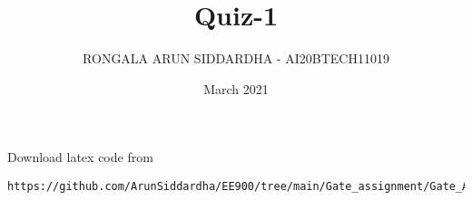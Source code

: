 \documentclass[journal,12pt,twocolumn]{IEEEtran}
\date{March 2021}
\DeclareMathOperator*{\Res}{Res}
\begin{document}
\newcommand{\multlinecomment}[1]{\directlua{-- #1}}
\newcommand{\BEQA}{\begin{eqnarray}}
\newcommand{\EEQA}{\end{eqnarray}}
\newcommand{\define}{\stackrel{\triangle}{=}}

\raggedbottom
\setlength{\parindent}{0pt}
\providecommand{\mbf}{\mathbf}
\providecommand{\pr}[1]{\ensuremath{\Pr\left(#1\right)}}
\providecommand{\qfunc}[1]{\ensuremath{Q\left(#1\right)}}
\providecommand{\fn}[1]{\ensuremath{f\left(#1\right)}}
\providecommand{\e}[1]{\ensuremath{E\left(#1\right)}}
\providecommand{\sbrak}[1]{\ensuremath{{}\left[#1\right]}}
\providecommand{\lsbrak}[1]{\ensuremath{{}\left[#1\right.}}
\providecommand{\rsbrak}[1]{\ensuremath{{}\left.#1\right]}}
\providecommand{\brak}[1]{\ensuremath{\left(#1\right)}}
\providecommand{\lbrak}[1]{\ensuremath{\left(#1\right.}}
\providecommand{\rbrak}[1]{\ensuremath{\left.#1\right)}}
\providecommand{\cbrak}[1]{\ensuremath{\left\{#1\right\}}}
\providecommand{\lcbrak}[1]{\ensuremath{\left\{#1\right.}}
\providecommand{\rcbrak}[1]{\ensuremath{\left.#1\right\}}}
\theoremstyle{remark}
\newtheorem{rem}{Remark}
\newcommand{\sgn}{\mathop{\mathrm{sgn}}}
\providecommand{\abs}[1]{\vert#1\vert}
\providecommand{\res}[1]{\Res\displaylimits_{#1}} 
\providecommand{\norm}[1]{\lVert#1\rVert}
\providecommand{\mtx}[1]{\mathbf{#1}}
\providecommand{\mean}[1]{E[ #1 ]}
\providecommand{\fourier}{\overset{\mathcal{F}}{ \rightleftharpoons}}
\providecommand{\system}{\overset{\mathcal{H}}{ \longleftrightarrow}}
\newcommand{\solution}{\noindent \textbf{Solution: }}
\newcommand{\cosec}{\,\text{cosec}\,}
\providecommand{\dec}[2]{\ensuremath{\overset{#1}{\underset{#2}{\gtrless}}}}
\newcommand{\myvec}[1]{\ensuremath{\begin{pmatrix}#1\end{pmatrix}}}
\newcommand{\mydet}[1]{\ensuremath{\begin{vmatrix}#1\end{vmatrix}}}
\makeatletter
\vspace{3cm}
\title{Quiz-1}
\author{RONGALA ARUN SIDDARDHA - AI20BTECH11019}
\maketitle
\newpage
\bigskip
\renewcommand{\thetable}{\theenumi}

%
Download latex code from 
%
\begin{lstlisting}
https://github.com/ArunSiddardha/EE900/tree/main/Gate_assignment/Gate_Assignment.tex
\end{lstlisting}
\end{document}
